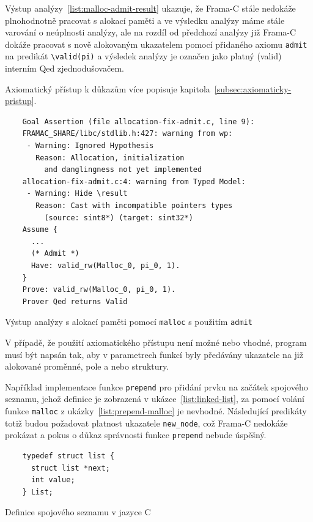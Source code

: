Výstup analýzy~\ref{list:malloc-admit-result} ukazuje,
že Frama\mbox{-}C stále nedokáže plnohodnotně pracovat s alokací paměti
a ve výsledku analýzy máme stále varování o neúplnosti analýzy,
ale na rozdíl od předchozí analýzy již Frama\mbox{-}C dokáže pracovat
s nově alokovaným ukazatelem pomocí přidaného axiomu \texttt{admit} na predikát \texttt{\textbackslash valid(pi)}
a výsledek analýzy je označen jako platný (valid) interním Qed zjednodušovačem.

Axiomatický přístup k důkazům více popisuje kapitola~\ref{subsec:axiomaticky-pristup}.

\begin{listing}[H]
    \begin{verbatim}
    Goal Assertion (file allocation-fix-admit.c, line 9):
    FRAMAC_SHARE/libc/stdlib.h:427: warning from wp:
     - Warning: Ignored Hypothesis
       Reason: Allocation, initialization
         and danglingness not yet implemented
    allocation-fix-admit.c:4: warning from Typed Model:
     - Warning: Hide \result
       Reason: Cast with incompatible pointers types
         (source: sint8*) (target: sint32*)
    Assume {
      ...
      (* Admit *)
      Have: valid_rw(Malloc_0, pi_0, 1).
    }
    Prove: valid_rw(Malloc_0, pi_0, 1).
    Prover Qed returns Valid
    \end{verbatim}
    \caption{Výstup analýzy s alokací paměti pomocí \texttt{malloc} s použitím \texttt{admit}}
    \label{list:malloc-admit-result}
\end{listing}

V případě, že použití axiomatického přístupu není možné nebo vhodné,
program musí být napsán tak,
aby v parametrech funkcí byly předávány ukazatele na již alokované proměnné,
pole a nebo struktury.

Například implementace funkce \texttt{prepend} pro přidání prvku na začátek spojového seznamu,
jehož definice je zobrazená v ukázce~\ref{list:linked-list},
za pomocí volání funkce \texttt{malloc} z ukázky~\ref{list:prepend-malloc} je nevhodné.
Následující predikáty totiž budou požadovat platnost ukazatele \texttt{new\_node},
což Frama\mbox{-}C nedokáže prokázat a pokus o důkaz správnosti funkce \texttt{prepend} nebude úspěšný.

\begin{listing}[H]
    \begin{verbatim}
    typedef struct list {
      struct list *next;
      int value;
    } List;
    \end{verbatim}
    \caption{Definice spojového seznamu v jazyce C}
    \label{list:linked-list}
\end{listing}

